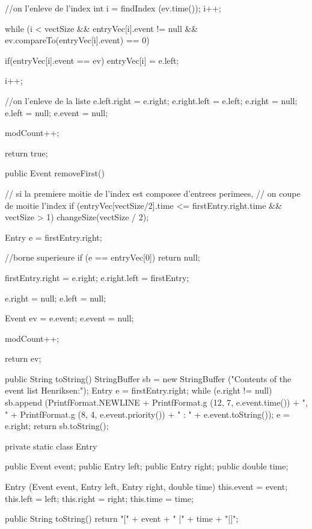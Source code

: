 \begin{code}
\begin{hide}
{{      //on l'enleve de l'index
      int i = findIndex (ev.time());
      i++;

      while (i < vectSize && entryVec[i].event != null &&
             ev.compareTo(entryVec[i].event) == 0) {
         if(entryVec[i].event == ev)
            entryVec[i] = e.left;

         i++;
      }

      //on l'enleve de la liste
      e.left.right = e.right;
      e.right.left = e.left;
      e.right = null;
      e.left = null;
      e.event = null;

      modCount++;

      return true;
   }

   public Event removeFirst() {
      // si la premiere moitie de l'index est composee d'entrees perimees,
      // on coupe de moitie l'index
      if (entryVec[vectSize/2].time <= firstEntry.right.time && vectSize > 1)
         changeSize(vectSize / 2);

      Entry e = firstEntry.right;

      //borne superieure
      if (e == entryVec[0])
         return null;

      firstEntry.right = e.right;
      e.right.left = firstEntry;

      e.right = null;
      e.left = null;

      Event ev = e.event;
      e.event = null;

      modCount++;

      return ev;
   }


   public String toString() {
      StringBuffer sb = new StringBuffer
                        ("Contents of the event list Henriksen:");
      Entry e = firstEntry.right;
      while (e.right != null) {
         sb.append (PrintfFormat.NEWLINE +
                    PrintfFormat.g (12, 7, e.event.time()) + ", " +
                    PrintfFormat.g (8, 4, e.event.priority()) + " : " +
                    e.event.toString());
         e = e.right;
      }
      return sb.toString();
   }


   private static class Entry {
      public Event event;
      public Entry left;
      public Entry right;
      public double time;

      Entry (Event event, Entry left, Entry right, double time) {
         this.event = event;
         this.left = left;
         this.right = right;
         this.time = time;
      }

      public String toString() {
         return "[" + event + " |" + time + "|]";
      }
   }


}
\end{hide}
\end{code}
